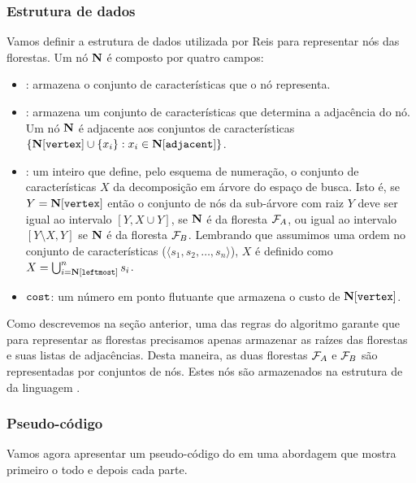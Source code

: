 \subsubsection{Estrutura de dados}
Vamos definir a estrutura de dados utilizada por Reis para representar
nós das florestas. Um nó $\mathbf N$ é composto por quatro campos:
\begin{itemize}
    \item{:} armazena o conjunto de características que 
        o nó representa. 
    \item{:} armazena um conjunto de características
        que determina a adjacência do nó. Um nó $\mathbf N$ é 
        adjacente aos conjuntos de características 
        $\{\mathbf N[\texttt{vertex}] \cup \{x_i\} : x_i \in \mathbf N[\texttt{adjacent}]\}$.
    \item{}: um inteiro que define, pelo esquema de
        numeração, o conjunto de características $X$ da decomposição
        em árvore do espaço de busca. Isto é, se
        $Y = \mathbf N[\texttt{vertex}]$ então o conjunto de nós da 
        sub-árvore com raiz $Y$ deve ser igual ao intervalo 
        $[Y, X \cup Y]$, se $\mathbf N$ é da floresta $\mathcal{F}_A$, ou
        igual ao intervalo $[Y \setminus X, Y]$ se $\mathbf N$ é da 
        floresta $\mathcal{F}_B$. Lembrando que assumimos uma ordem no 
        conjunto de características ($\langle s_1, s_2, \dots, 
        s_n\rangle$), $X$ é definido como 
            $X = \bigcup_{i = \mathbf N[\texttt{leftmost}]}^{n} s_i$.
    \item{$\texttt{cost}$:} um número em ponto flutuante que armazena
        o custo de $\mathbf N[\texttt{vertex}]$.
\end{itemize}

Como descrevemos na seção anterior, uma das regras do algoritmo garante
que para representar as florestas precisamos apenas armazenar as raízes
das florestas e suas listas de adjacências. Desta maneira, as duas 
florestas $\mathcal{F}_A$ e $\mathcal{F}_B$ são representadas por conjuntos de
nós. Estes nós são armazenados na estrutura de  da 
linguagem . 
\newpage
\subsubsection{Pseudo-código}
Vamos agora apresentar um pseudo-código do  em uma 
abordagem que mostra primeiro o todo e depois cada parte.

